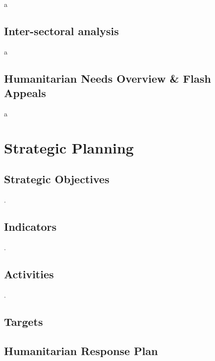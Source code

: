 \documentclass[
  a4paper,
  onecolumn,
  oneside]{book}
\begin{document}
a

\hypertarget{inter-sectoral-analysis}{%
\section{Inter-sectoral analysis}\label{inter-sectoral-analysis}}

a

\hypertarget{humanitarian-needs-overview-flash-appeals}{%
\section{Humanitarian Needs Overview \& Flash
Appeals}\label{humanitarian-needs-overview-flash-appeals}}

a

\hypertarget{strategic-planning}{%
\chapter{Strategic Planning}\label{strategic-planning}}

\hypertarget{strategic-objectives}{%
\section{Strategic Objectives}\label{strategic-objectives}}

.

\hypertarget{indicators-1}{%
\section{Indicators}\label{indicators-1}}

.

\hypertarget{activities-1}{%
\section{Activities}\label{activities-1}}

.

\hypertarget{targets}{%
\section{Targets}\label{targets}}

\hypertarget{humanitarian-response-plan}{%
\section{Humanitarian Response Plan}\label{humanitarian-response-plan}}
\end{document}
